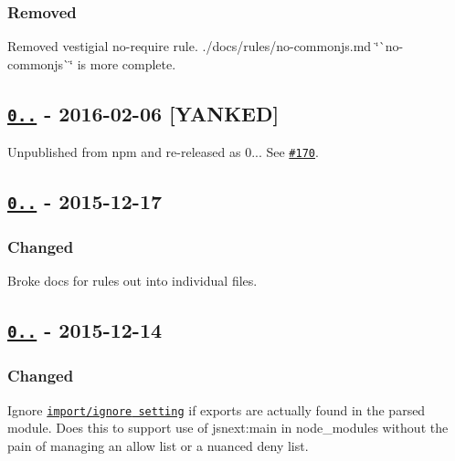 \subsubsection*{Removed}


\begin{DoxyItemize}
\item Removed vestigial {\ttfamily no-\/require} rule. ./docs/rules/no-\/commonjs.md \char`\"{}\`{}no-\/commonjs\`{}\char`\"{} is more complete.
\end{DoxyItemize}

\subsection*{\href{https://github.com/benmosher/eslint-plugin-import/compare/v0.12.1...v0.12.2}{\tt 0..} -\/ 2016-\/02-\/06 \mbox{[}Y\+A\+N\+K\+ED\mbox{]}}

Unpublished from npm and re-\/released as 0... See \href{https://github.com/benmosher/eslint-plugin-import/issues/170}{\tt \#170}.

\subsection*{\href{https://github.com/benmosher/eslint-plugin-import/compare/v0.12.0...v0.12.1}{\tt 0..} -\/ 2015-\/12-\/17}

\subsubsection*{Changed}


\begin{DoxyItemize}
\item Broke docs for rules out into individual files.
\end{DoxyItemize}

\subsection*{\href{https://github.com/benmosher/eslint-plugin-import/compare/v0.11.0...v0.12.0}{\tt 0..} -\/ 2015-\/12-\/14}

\subsubsection*{Changed}


\begin{DoxyItemize}
\item Ignore \href{./README.md#importignore}{\tt {\ttfamily import/ignore} setting} if exports are actually found in the parsed module. Does this to support use of {\ttfamily jsnext\+:main} in {\ttfamily node\+\_\+modules} without the pain of managing an allow list or a nuanced deny list.
\end{DoxyItemize}

